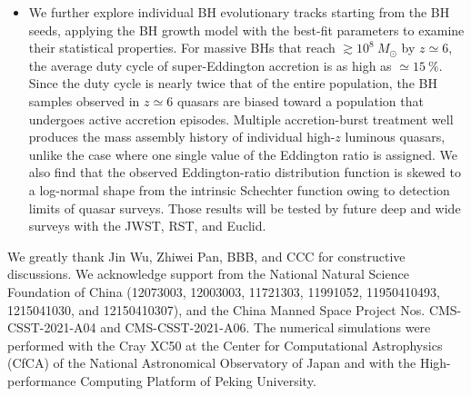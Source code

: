 \documentclass[twocolumn, twocolappendix]{aastex63}
\newcommand{\Msun}{M_\odot}
\begin{document}
\begin{CJK*}{UTF8}{gbsn}
\begin{itemize}
\item
We further explore individual BH evolutionary tracks starting from the BH seeds, applying the BH growth model
with the best-fit parameters to examine their statistical properties.
For massive BHs that reach $\gtrsim 10^8~\Msun$ by $z\simeq 6$, the average duty cycle of super-Eddington accretion is as high as $\simeq 15~\%$.
Since the duty cycle is nearly twice that of the entire population, the BH samples observed in $z\simeq 6$ quasars are
biased toward a population that undergoes active accretion episodes.
Multiple accretion-burst treatment well produces the mass assembly history of individual high-$z$ luminous quasars,
unlike the case where one single value of the Eddington ratio is assigned.
We also find that the observed Eddington-ratio distribution function is skewed to a log-normal shape from the intrinsic Schechter function
owing to detection limits of quasar surveys.
Those results will be tested by future deep and wide surveys with the JWST, RST, and Euclid.
\end{itemize}

\acknowledgments
We greatly thank Jin Wu, Zhiwei Pan, BBB, and CCC for constructive discussions. 
We acknowledge support from the National Natural Science Foundation of China 
(12073003, 12003003, 11721303, 11991052, 11950410493, 1215041030, and 12150410307), 
and the China Manned Space Project Nos. CMS-CSST-2021-A04 and CMS-CSST-2021-A06. 
The numerical simulations were performed with the Cray XC50 at the Center for Computational Astrophysics (CfCA) 
of the National Astronomical Observatory of Japan and with the High-performance Computing Platform of Peking University.
%





\end{CJK*}
\end{document}

